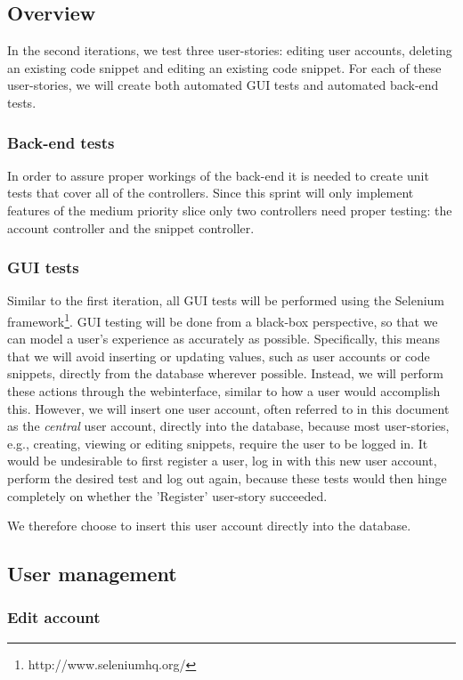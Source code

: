 \documentclass[10pt,a4paper,BCOR12mm, headexclude, footexclude,
  twoside, openright]{scrartcl}
\numberwithin{equation}{section} %
\numberwithin{figure}{section} %
\numberwithin{table}{section} %
\begin{document}
\subsection{Overview}
In the second iterations, we test three user-stories: editing user accounts, deleting an existing code snippet and editing an existing code snippet.
For each of these user-stories, we will create both automated GUI tests and automated back-end tests.

\subsubsection*{Back-end tests}
In order to assure proper workings of the back-end it is needed to create unit
tests that cover all of the controllers. Since this sprint will only implement
features of the medium priority slice only two controllers need proper testing:
the account controller and the snippet controller.

\subsubsection*{GUI tests}
Similar to the first iteration, all GUI tests will be performed using the Selenium framework\footnote{http://www.seleniumhq.org/}.
GUI testing will be done from a black-box perspective, so that we can model a user's experience as accurately as possible.
Specifically, this means that we will avoid inserting or updating values, such as user accounts or code snippets, directly from the database wherever possible.
Instead, we will perform these actions through the webinterface, similar to how a user would accomplish this.
However, we will insert one user account, often referred to in this document as the \emph{central} user account, directly into the database, because most user-stories, e.g., creating, viewing or editing snippets, require the user to be logged in.
It would be undesirable to first register a user, log in with this new user account, perform the desired test and log out again, because these tests would then hinge completely on whether the 'Register' user-story succeeded.

We therefore choose to insert this user account directly into the database.

\subsection{User management}

\subsubsection*{Edit account}
\end{document}
